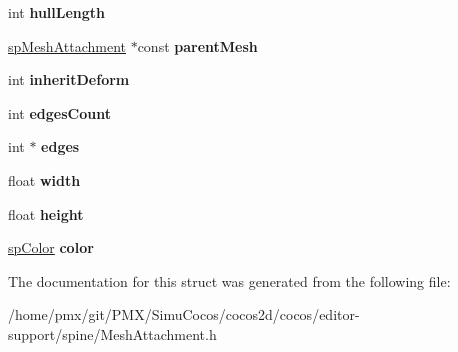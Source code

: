 \begin{DoxyCompactItemize}
int {\bfseries hull\+Length}
\item 
\mbox{\label{structspMeshAttachment_a4098369b8af0a926820154f01237f6b8}} 
\hyperlink{structspMeshAttachment}{sp\+Mesh\+Attachment} $\ast$const {\bfseries parent\+Mesh}
\item 
\mbox{\label{structspMeshAttachment_acc6374dab1cd8c8d87325828f1b7bb86}} 
int {\bfseries inherit\+Deform}
\item 
\mbox{\label{structspMeshAttachment_a726c412161db06718d49ae84a7fe6c00}} 
int {\bfseries edges\+Count}
\item 
\mbox{\label{structspMeshAttachment_a76cde312809074ee0ef814cfb4695a5f}} 
int $\ast$ {\bfseries edges}
\item 
\mbox{\label{structspMeshAttachment_a0ae12bdf4ed0c2d76278c994b66ffaeb}} 
float {\bfseries width}
\item 
\mbox{\label{structspMeshAttachment_a5a1c4e2c4ec3bbe9cbb053c29903e176}} 
float {\bfseries height}
\item 
\mbox{\label{structspMeshAttachment_ab84e027f87c8bcd518e2194d4ba9ca2b}} 
\hyperlink{structspColor}{sp\+Color} {\bfseries color}
\end{DoxyCompactItemize}


The documentation for this struct was generated from the following file\+:\begin{DoxyCompactItemize}
\item 
/home/pmx/git/\+P\+M\+X/\+Simu\+Cocos/cocos2d/cocos/editor-\/support/spine/Mesh\+Attachment.\+h\end{DoxyCompactItemize}
